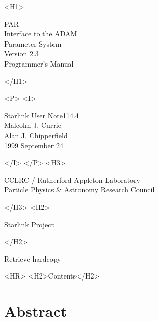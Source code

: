 \documentclass[twoside,11pt]{article}
\newcommand{\stardoccategory}  {Starlink User Note}
\newcommand{\stardocsource}    {sun\stardocnumber}
\newcommand{\stardocnumber}    {114.4}
\newcommand{\stardocauthors}   {Malcolm J. Currie\\
                                Alan J. Chipperfield}
\newcommand{\stardocdate}      {1999 September 24}
\newcommand{\stardoctitle}     {PAR \\ [1ex]
                                Interface to the ADAM \\
                                Parameter System}
\newcommand{\stardocversion}   {Version 2.3}
\newcommand{\stardocmanual}    {Programmer's Manual}
\newcommand{\htmladdnormallink}[2]{#1}
\newcommand{\htmladdimg}[1]{}
\newcommand{\htmlref}[2]{#1}
\newcommand{\htmladdtonavigation}[1]{}
\newcommand{\xlabel}[1]{}
\newcommand{\latexonlytoc}[0]{\tableofcontents}
\begin{document}
\begin{htmlonly}
   \xlabel{}
   \begin{rawhtml} <H1> \end{rawhtml}
      \stardoctitle\\
      \stardocversion\\
      \stardocmanual
   \begin{rawhtml} </H1> \end{rawhtml}


   \begin{rawhtml} <P> <I> \end{rawhtml}
   \stardoccategory \stardocnumber \\
   \stardocauthors \\
   \stardocdate
   \begin{rawhtml} </I> </P> <H3> \end{rawhtml}
      \htmladdnormallink{CCLRC}{http://www.cclrc.ac.uk} /
      \htmladdnormallink{Rutherford Appleton Laboratory}
                        {http://www.cclrc.ac.uk/ral} \\
      \htmladdnormallink{Particle Physics \& Astronomy Research Council}
                        {http://www.pparc.ac.uk} \\
   \begin{rawhtml} </H3> <H2> \end{rawhtml}
      \htmladdnormallink{Starlink Project}{http://star-www.rl.ac.uk/}
   \begin{rawhtml} </H2> \end{rawhtml}
   \htmladdnormallink{\htmladdimg{source.gif} Retrieve hardcopy}
      {http://star-www.rl.ac.uk/cgi-bin/hcserver?\stardocsource}\\

  \label{stardoccontents}
  \begin{rawhtml} 
    <HR>
    <H2>Contents</H2>
  \end{rawhtml}
  \renewcommand{\latexonlytoc}[0]{}
  \htmladdtonavigation{\htmlref{\htmladdimg{contents_motif.gif}}
        {stardoccontents}}

  \section{\xlabel{abstract}Abstract}
\end{htmlonly}
\end{document}
